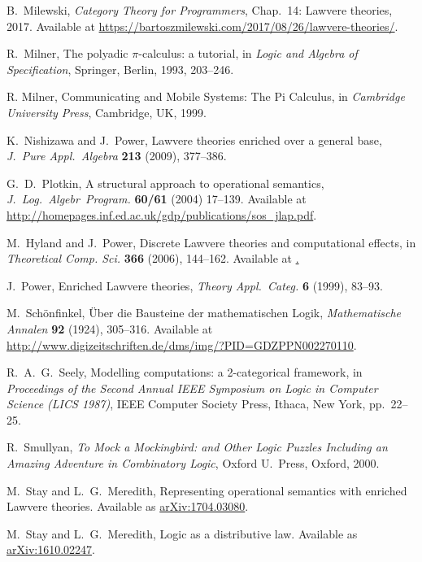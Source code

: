 \documentclass{amsart}
\theoremstyle{definition}
\begin{document}
\begin{thebibliography}{100}

 B.\ Milewski, \textsl{Category Theory for Programmers}, Chap.\ 14: Lawvere theories, 2017.   Available at \href{https://bartoszmilewskiski.com/2017/08/26/lawvere-theories/}{https://bartoszmilewski.com/2017/08/26/lawvere-theories/}.

 R.\ Milner, The polyadic {$\pi$}-calculus: a tutorial, in \textsl{Logic and Algebra of Specification}, Springer, Berlin, 1993, 203--246.

 R. Milner, Communicating and Mobile Systems: The Pi Calculus, in \textsl{Cambridge University Press}, Cambridge, UK, 1999.

 K.\ Nishizawa and J.\ Power, Lawvere theories enriched over a general base, \textsl{J.\ Pure Appl.\ Algebra}  \textbf{213} (2009), 377--386.

 G.\ D.\ Plotkin, A structural approach to operational semantics, \textsl{J.\ Log.\ Algebr\ Program.} \textbf{60/61} (2004) 17--139.  Available at \href{http://homepages.inf.ed.ac.uk/gdp/publications/sos_jlap.pdf}{http://homepages.inf.ed.ac.uk/gdp/publications/sos\_jlap.pdf}.

 M.\ Hyland and J.\ Power, Discrete Lawvere theories and computational effects, in \textsl{Theoretical Comp.
Sci.} \textbf{366} (2006), 144--162. Available at \href{https://core.ac.uk/download/pdf/81105779.pdf}.
  
 J.\ Power, Enriched Lawvere theories, \textsl{Theory Appl.\ Categ.}  \textbf{6} (1999), 83--93.

 M.\ Sch\"{o}nfinkel, \"Uber die Bausteine der mathematischen Logik, 
 \textsl{Mathematische Annalen} \textbf{92} (1924), 305--316.  Available at \href{http://www.digizeitschriften.de/dms/img/?PID=GDZPPN002270110}{http://www.digizeitschriften.de/dms/img/?PID=GDZPPN002270110}.

 R.\ A.\ G.\ Seely, Modelling computations: a 2-categorical framework, in
\textsl{Proceedings of the Second Annual IEEE Symposium on Logic in Computer Science (LICS 1987)}, IEEE Computer Society Press, Ithaca, New York, pp.\ 22--25.
 

 R.\ Smullyan, \textsl{To Mock a Mockingbird: and Other Logic Puzzles Including an Amazing Adventure in Combinatory Logic}, Oxford U.\ Press, Oxford, 2000.
	
 M.\ Stay and L.\ G.\ Meredith, Representing operational semantics 
with enriched Lawvere theories.  Available as
\href{https://arxiv.org/abs/1704.03080}{arXiv:1704.03080}.

 M.\ Stay and L.\ G.\ Meredith, Logic as a distributive law.  Available as \href{https://arxiv.org/abs/1610.02247}{arXiv:1610.02247}.

\end{thebibliography}
\end{document}
